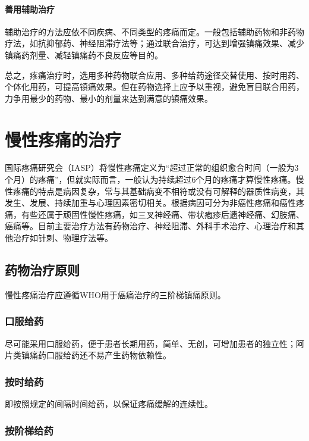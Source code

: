 \paragraph{善用辅助治疗}

辅助治疗的方法应依不同疾病、不同类型的疼痛而定。一般包括辅助药物和非药物疗法，如抗抑郁药、神经阻滞疗法等；通过联合治疗，可达到增强镇痛效果、减少镇痛药剂量、减轻镇痛药不良反应等目的。

总之，疼痛治疗时，选用多种药物联合应用、多种给药途径交替使用、按时用药、个体化用药，可提高镇痛效果。但在药物选择上应予以重视，避免盲目联合用药，力争用最少的药物、最小的剂量来达到满意的镇痛效果。

\section{慢性疼痛的治疗}

国际疼痛研究会（IASP）将慢性疼痛定义为“超过正常的组织愈合时间（一般为3个月）的疼痛”，但就实际而言，一般认为持续超过6个月的疼痛才算慢性疼痛。慢性疼痛的特点是病因复杂，常与其基础病变不相符或没有可解释的器质性病变，其发生、发展、持续加重与心理因素密切相关。根据病因可分为非癌性疼痛和癌性疼痛，有些还属于顽固性慢性疼痛，如三叉神经痛、带状疱疹后遗神经痛、幻肢痛、癌痛等。目前主要治疗方法有药物治疗、神经阻滞、外科手术治疗、心理治疗和其他治疗如针刺、物理疗法等。

\subsection{药物治疗原则}

慢性疼痛治疗应遵循WHO用于癌痛治疗的三阶梯镇痛原则。

\subsubsection{口服给药}

尽可能采用口服给药，便于患者长期用药，简单、无创，可增加患者的独立性；阿片类镇痛药口服给药还不易产生药物依赖性。

\subsubsection{按时给药}

即按照规定的间隔时间给药，以保证疼痛缓解的连续性。

\subsubsection{按阶梯给药}

